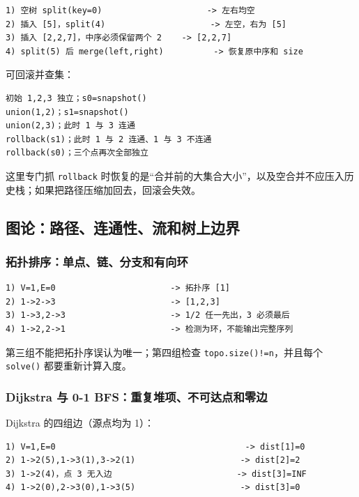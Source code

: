 \begin{lstlisting}
1) 空树 split(key=0)                     -> 左右均空
2) 插入 [5]，split(4)                     -> 左空，右为 [5]
3) 插入 [2,2,7]，中序必须保留两个 2    -> [2,2,7]
4) split(5) 后 merge(left,right)          -> 恢复原中序和 size
\end{lstlisting}

可回滚并查集：

\begin{lstlisting}
初始 1,2,3 独立；s0=snapshot()
union(1,2)；s1=snapshot()
union(2,3)；此时 1 与 3 连通
rollback(s1)；此时 1 与 2 连通、1 与 3 不连通
rollback(s0)；三个点再次全部独立
\end{lstlisting}

这里专门抓 \passthrough{\lstinline!rollback!} 时恢复的是``合并前的大集合大小''，以及空合并不应压入历史栈；如果把路径压缩加回去，回滚会失效。

\subsection{图论：路径、连通性、流和树上边界}

\subsubsection{拓扑排序：单点、链、分支和有向环}

\begin{lstlisting}
1) V=1,E=0                       -> 拓扑序 [1]
2) 1->2->3                       -> [1,2,3]
3) 1->3,2->3                     -> 1/2 任一先出，3 必须最后
4) 1->2,2->1                     -> 检测为环，不能输出完整序列
\end{lstlisting}

第三组不能把拓扑序误认为唯一；第四组检查 \passthrough{\lstinline"topo.size()!=n"}，并且每个 \passthrough{\lstinline!solve()!} 都要重新计算入度。

\subsubsection{Dijkstra 与 0-1 BFS：重复堆项、不可达点和零边}

Dijkstra 的四组边（源点均为 1）：

\begin{lstlisting}
1) V=1,E=0                                      -> dist[1]=0
2) 1->2(5),1->3(1),3->2(1)                     -> dist[2]=2
3) 1->2(4)，点 3 无入边                         -> dist[3]=INF
4) 1->2(0),2->3(0),1->3(5)                     -> dist[3]=0
\end{lstlisting}

